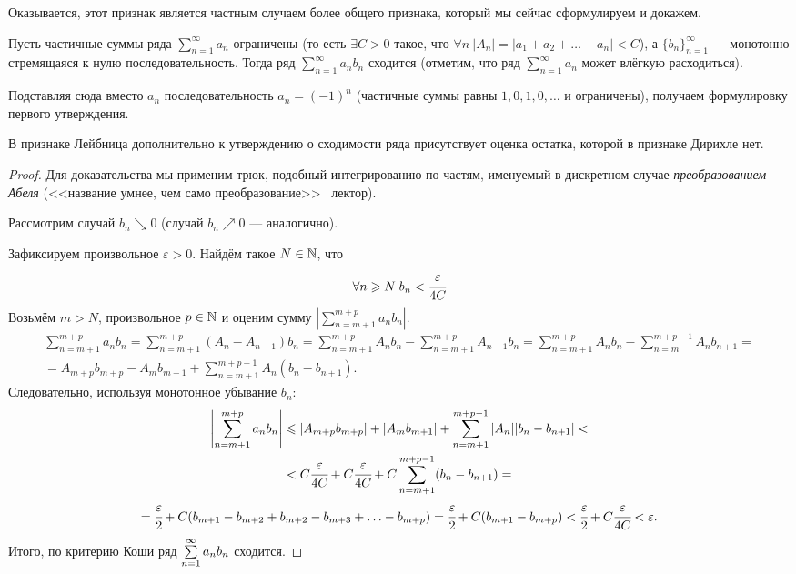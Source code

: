 \documentclass[a4paper, 12pt]{article}
\begin{document}
Оказывается, этот признак является частным случаем более общего признака, который мы сейчас сформулируем и докажем.
\begin{Test}
	Пусть частичные суммы ряда $\sum\limits_{n=1}^{\infty}a_n$ ограничены (то есть $\exists C>0$ такое, что $\forall n\ |A_n| = |a_1 + a_2 + \ldots + a_n| < C$), а $\{b_n\}_{n=1}^{\infty}$ --- монотонно стремящаяся к нулю  последовательность. Тогда ряд $\sum\limits_{n=1}^{\infty}a_nb_n$ сходится (отметим, что ряд $\sum\limits_{n=1}^{\infty}a_n$ может влёгкую расходиться). 
\end{Test}
Подставляя сюда вместо $a_n$ последовательность $a_n = (-1)^n$ (частичные суммы равны $1, 0, 1, 0, \ldots$ и ограничены), получаем формулировку первого утверждения.
\begin{Comment}
	В признаке Лейбница дополнительно к утверждению о сходимости ряда присутствует оценка остатка, которой в признаке Дирихле нет.
\end{Comment}
\begin{proof}
	Для доказательства мы применим трюк, подобный интегрированию по частям, именуемый в дискретном случае \textit{преобразованием Абеля} (<<название умнее, чем само преобразование>> \textcopyright\ лектор).
	
	Рассмотрим случай $b_n \searrow 0$ (случай $b_n \nearrow 0$ --- аналогично).
	
	Зафиксируем произвольное $\varepsilon>0$. Найдём такое $N \in \mathbb{N}$, что 
	$$
		\forall n\geqslant N\; b_n < \cfrac{\varepsilon}{4C}
	$$
	Возьмём $m>N$, произвольное $p\in \mathbb{N}$ и оценим сумму $\left|\sum\limits_{n=m + 1}^{m+p}a_n b_n\right|$.
	\begin{gather*}
		\sum\limits_{n=m+1}^{m+p} a_n b_n = \sum\limits_{n=m+1}^{m+p}\left(A_n - A_{n-1}\right)b_n = \sum\limits_{n=m+1}^{m+p} A_nb_n - \sum\limits_{n=m+1}^{m+p} A_{n-1} b_n = \sum\limits_{n=m+1}^{m+p}A_nb_n - \sum\limits_{n=m}^{m+p - 1}A_nb_{n+1} = \\
		= A_{m+p} b_{m+p} - A_mb_{m+1} + \sum\limits_{n=m+1}^{m+p - 1}A_n\left(b_n-b_{n+1}\right).
	\end{gather*}
	Следовательно, используя монотонное убывание $b_n$:
	\begin{gather*}
		\left|\sum\limits_{n=m+1}^{m+p} a_n b_n\right| \leqslant |A_{m+p}b_{m+p}| + |A_mb_{m+1}| + 		\sum\limits_{n=m+1}^{m+p-1} |A_n||b_n - b_{n+1}| <\\ < C\cfrac{\varepsilon}{4C} + C \cfrac{\varepsilon}{4C} + C 	\sum\limits_{n=m+1}^{m+p-1}( b_n - b_{n+1}) =\\= \cfrac{\varepsilon}{2} + C(b_{m+1} -b_{m+2} + b_{m + 2} - b_{m+3} + \ldots -b_{m+p}) = \cfrac{\varepsilon}{2} + C(b_{m+1} - b_{m+p}) < \cfrac{\varepsilon}{2} + C\cfrac{\varepsilon}{4C} < \varepsilon.
	\end{gather*}
	Итого, по критерию Коши ряд $\sum\limits_{n=1}^{\infty}a_nb_n$ сходится.
\end{proof}
\end{document}

